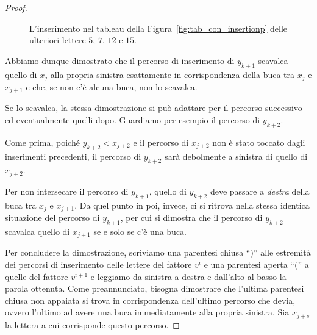 \begin{proof}
\begin{figure}
        \caption{L'inserimento nel tableau della Figura~\ref{fig:tab_con_insertionp}
        delle ulteriori lettere $5$, $7$, $12$ e $15$.}
        \label{fig:tab_con_intertionp_v2}
    \end{figure}
    
    Abbiamo dunque dimostrato che il percorso di inserimento di $y_{k+1}$
    scavalca quello di $x_j$ alla propria sinistra esattamente in corrispondenza
    della buca tra $x_j$ e $x_{j+1}$ e che, se non c'\`e alcuna buca, non lo scavalca.

    Se lo scavalca, la stessa dimostrazione si pu\`o adattare per il percorso
    successivo ed eventualmente quelli dopo.
    Guardiamo per esempio il percorso di $y_{k+2}$.

    Come prima, poich\'e $y_{k+2}< x_{j+2}$ e il percorso di $x_{j+2}$ non \`e stato toccato 
    dagli inserimenti precedenti, il percorso di $y_{k+2}$ sar\`a debolmente
    a sinistra di quello di $x_{j+2}$.

    Per non intersecare il percorso di $y_{k+1}$, quello di $y_{k+2}$ deve passare
    a \emph{destra} della buca tra $x_j$ e $x_{j+1}$.
    Da quel punto in poi, invece, ci si ritrova nella stessa identica situazione del
    percorso di $y_{k+1}$, per cui si dimostra che il percorso di $y_{k+2}$ scavalca
    quello di $x_{j+1}$ se e solo se c'\`e una buca.

    Per concludere la dimostrazione, scriviamo una parentesi chiusa ``$)$'' alle estremit\`a
    dei percorsi di inserimento delle lettere del fattore $v^i$ e una parentesi
    aperta ``$\lparen$'' a quelle del fattore $v^{i+1}$ e leggiamo da sinistra a destra
    e dall'alto al basso la parola ottenuta.
    Come preannunciato, bisogna dimostrare che l'ultima parentesi chiusa
    non appaiata si trova in corrispondenza dell'ultimo percorso che devia, ovvero
    l'ultimo ad avere una buca immediatamente alla propria sinistra.
    Sia $x_{j+s}$ la lettera a cui corrisponde questo percorso.


\end{proof}
